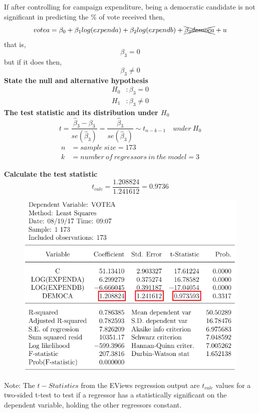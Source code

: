 \documentclass[12pt]{report}
\begin{document}
\noindent If after controlling for campaign expenditure, being a democratic candidate is not significant in predicting the \% of vote received then,
$$votea = \beta_0 + \beta_1log(expenda) + \beta_2log(expendb) + \xcancel{\beta_3democa} + u $$
\noindent that is,
$$\beta_3 = 0$$
\noindent but if it does then,
$$\beta_3 \neq 0$$
\noindent \textbf{State the null and alternative hypothesis}
\begin{align*}
H_0&: \beta_3 = 0 \\
H_1&: \beta_3 \neq 0
\end{align*}
\noindent \textbf{The test statistic and its distribution under $H_0$}
$$t = \dfrac{\hat{\beta}_3 - \beta_3}{se(\hat{\beta}_3)} = \dfrac{\hat{\beta}_3}{se(\hat{\beta}_3)} \sim t_{n-k-1} \quad under\ H_0$$
\begin{align*}
n &= sample\ size = 173 \\
k &= number\ of\ regressors\ in\ the\ model = 3
\end{align*}

\noindent \textbf{Calculate the test statistic}
$$t_{calc} = \dfrac{1.208824}{1.241612} = 0.9736$$
\begin{figure}[H]
	\centering
	\includegraphics{q1_9}
\end{figure}
\vspace{-\baselineskip}
\noindent Note: The $t-Statistics$ from the EViews regression output are $t_{calc}$ values for a two-sided t-test to test if a regressor has a statistically significant on the dependent variable, holding the other regressors constant.
\end{document}
